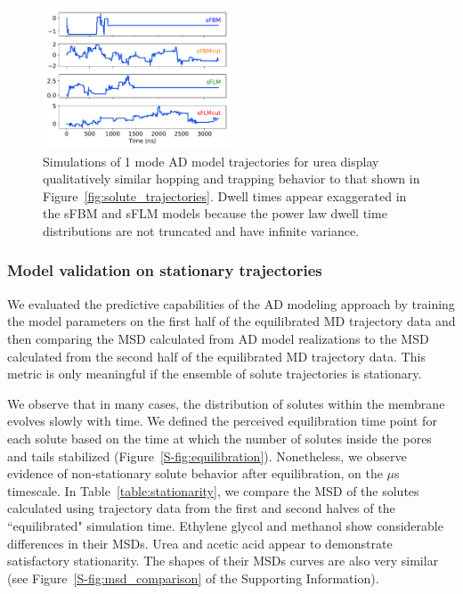 \documentclass{article}
\begin{document}
  \begin{figure}
  \centering
  \includegraphics[width=0.5\textwidth]{ad_realizations_1mode.pdf}
  \caption{Simulations of 1 mode AD model trajectories for urea display qualitatively
  similar hopping and trapping behavior to that shown in Figure~\ref{fig:solute_trajectories}. 
  Dwell times appear exaggerated in the sFBM and sFLM models because the power law dwell
  time distributions are not truncated and have infinite variance.
  }\label{fig:ad_eyetest}
  \end{figure}
  
  \subsubsection{Model validation on stationary trajectories}\label{section:sfbm_validation}

  We evaluated the predictive capabilities of the AD modeling approach by training
  the model parameters on the first half of the equilibrated MD trajectory data and
  then comparing the MSD calculated from AD model realizations to the MSD calculated
  from the second half of the equilibrated MD trajectory data. This metric is
  only meaningful if the ensemble of solute trajectories is stationary.
  
  We observe that in many cases, the distribution of solutes within the membrane
  evolves slowly with time. We defined the perceived equilibration time point 
  for each solute based on the time at which the number of solutes inside the
  pores and tails stabilized (Figure~\ref{S-fig:equilibration}). Nonetheless, we observe evidence of non-stationary
  solute behavior after equilibration, on the $\mu$s timescale. In Table~\ref{table:stationarity},
  we compare the MSD of the solutes calculated using trajectory data from the 
  first and second halves of the ``equilibrated" simulation time. Ethylene glycol 
  and methanol show considerable differences in their MSDs. Urea and acetic acid
  appear to demonstrate satisfactory stationarity. The shapes of their MSDs curves
  are also very similar (see Figure~\ref{S-fig:msd_comparison} of the Supporting
  Information).
  
\end{document}
